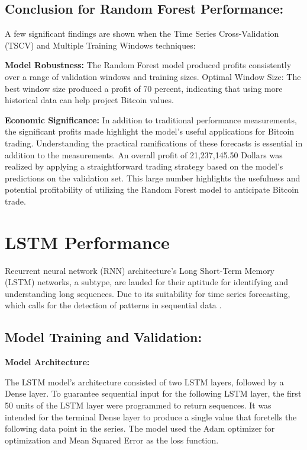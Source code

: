 \subsection{Conclusion for Random Forest Performance:}

A few significant findings are shown when the Time Series Cross-Validation (TSCV) and Multiple Training Windows techniques:

\textbf{Model Robustness:} The Random Forest model produced profits consistently over a range of validation windows and training sizes.
Optimal Window Size: The best window size produced a profit of 70 percent, indicating that using more historical data can help project Bitcoin values.

\textbf{Economic Significance:} In addition to traditional performance measurements, the significant profits made highlight the model's useful applications for Bitcoin trading. Understanding the practical ramifications of these forecasts is essential in addition to the measurements. An overall profit of 21,237,145.50 Dollars was realized by applying a straightforward trading strategy based on the model's predictions on the validation set. This large number highlights the usefulness and potential profitability of utilizing the Random Forest model to anticipate Bitcoin trade.

\goodbreak
\section{LSTM Performance}
\goodbreak

Recurrent neural network (RNN) architecture's Long Short-Term Memory (LSTM) networks, a subtype, are lauded for their aptitude for identifying and understanding long sequences. Due to its suitability for time series forecasting, which calls for the detection of patterns in sequential data \citep{Hochreiter1997LongSM}. 

\subsection{Model Training and Validation:}

\textbf{Model Architecture:}

The LSTM model's architecture consisted of two LSTM layers, followed by a Dense layer. To guarantee sequential input for the following LSTM layer, the first 50 units of the LSTM layer were programmed to return sequences. It was intended for the terminal Dense layer to produce a single value that foretells the following data point in the series. The model used the Adam optimizer for optimization and Mean Squared Error as the loss function.

